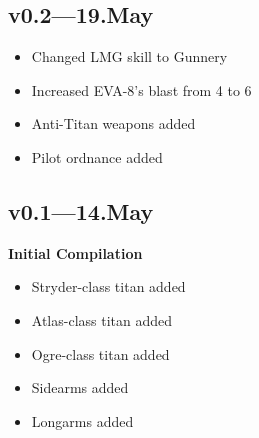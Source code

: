 \documentclass[9pt, openany]{extbook}
\begin{document}
{\subsection{v0.2---19.May}
\begin{itemize}[noitemsep]
\item Changed LMG skill to Gunnery
\item Increased EVA-8's blast from 4 to 6
\item Anti-Titan weapons added
\item Pilot ordnance added
\end{itemize}


\subsection{v0.1---14.May}
\textbf{Initial Compilation}

\begin{itemize}[noitemsep]
\item Stryder-class titan added
\item Atlas-class titan added
\item Ogre-class titan added
\item Sidearms added
\item Longarms added
\end{itemize}


}
\end{document}
